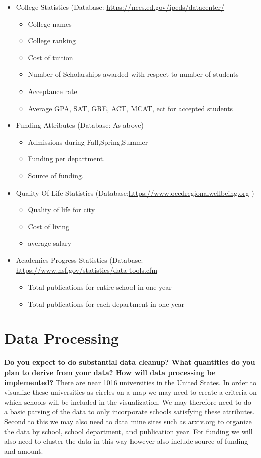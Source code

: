 \documentclass[11pt, a4paper]{article}
\begin{document}
\begin{itemize}
  \setlength\itemsep{0.5em}
\item College Statistics (Database: \href{https://nces.ed.gov/ipeds/datacenter/}{https://nces.ed.gov/ipeds/datacenter/}
  \begin{itemize}
\item College names
\item College ranking
\item Cost of tuition
\item Number of Scholarships awarded with respect to number of students
\item Acceptance rate
\item Average GPA, SAT, GRE, ACT, MCAT, ect for accepted students
\end{itemize}
\item Funding Attributes (Database: As above)
  \begin{itemize}
\item Admissions during Fall,Spring,Summer
\item Funding per department.
\item Source of funding.
\end{itemize}
\item Quality Of Life Statistics (Database:\href{https://www.oecdregionalwellbeing.org}{https://www.oecdregionalwellbeing.org} )
  \begin{itemize}
\item Quality of life for city
\item Cost of living
\item average salary
\end{itemize}
\item Academics Progress Statistics (Database: \href{https://www.nsf.gov/statistics/data-tools.cfm}{https://www.nsf.gov/statistics/data-tools.cfm}
  \begin{itemize}
  \item Total publications for entire school in one year
  \item Total publications for each department in one year
    \end{itemize}
\end{itemize}
  \section{Data Processing}\textbf{ Do you expect to do substantial data cleanup? What quantities do you plan to derive from your data? How will data processing be implemented?}
  There are near 1016 universities in the United States. In order to visualize these universities as circles on a map we may need to create a criteria on which schools will be included in the visualization. We may therefore need to do a basic parsing of the data to only incorporate schools satisfying these attributes. Second to this we may also need to data mine sites such as arxiv.org to organize the data by school, school department, and publication year. For funding we will also need to cluster the data in this way however also include source of funding and amount. 
\end{document}
